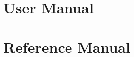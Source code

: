 \documentclass{book}
\begin{document}

\pagestyle{plain}
\setcounter{page}{0}

\cleardoublepage
{}
\tableofcontents
\cleardoublepage
{}
 
\part{User Manual}


\part{Reference Manual}

\listofrefpages







\ccTexHtml{\printindex}{}
\end{document}

